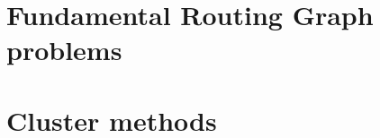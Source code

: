 \documentclass[letter, 12pt, english, draft]{article}
\begin{document}
\section{Fundamental Routing Graph problems}


\section{Cluster methods}


{}
\end{document}
